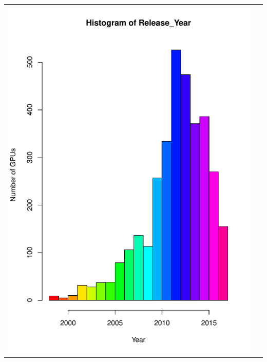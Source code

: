 \documentclass[a4paper]{article}
\begin{document}
\begin{center}
\begin{adjustbox}{width=1\textwidth}
    \begin{tabular}{cc}
        \includegraphics[keepaspectratio, width=1\textwidth, height=1\textheight]{Visualization/Hist/release_year.pdf}

\end{tabular}
\end{adjustbox}
\end{center}
\end{document}
